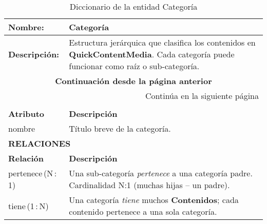 \renewcommand{\arraystretch}{1.3}
\begin{longtable}{|p{3.5cm}|p{10cm}|}
\caption{Diccionario de la entidad Categoría}
\label{tab:diccionarioCategoria} \\ 
\hline
\textbf{Nombre:} & Categoría \\
\hline
\textbf{Descripción:} & 
Estructura jerárquica que clasifica los contenidos en
\textbf{QuickContentMedia}.  Cada categoría puede funcionar como raíz o
sub-categoría. \\ \hline
\endfirsthead

\multicolumn{2}{c}{\textbf{Continuación desde la página anterior}} \\ 
\endhead

\hline \multicolumn{2}{r}{{Continúa en la siguiente página}} \\ 
\endfoot

\hline
\endlastfoot

\multicolumn{2}{|p{13.5cm}|}{\textbf{ATRIBUTOS}} \\ \hline
\textbf{Atributo} & \textbf{Descripción} \\ \hline
nombre             & Título breve de la categoría. \\ \hline

\multicolumn{2}{|p{13.5cm}|}{\textbf{RELACIONES}} \\ \hline
\textbf{Relación} & \textbf{Descripción} \\ \hline
pertenece\,(N\,:\,1) & Una sub-categoría \textit{pertenece} a
                       una categoría padre.  Cardinalidad N:1 (muchas hijas – un padre). \\ \hline
tiene\,(1\,:\,N) & Una categoría \textit{tiene} muchos
                   \textbf{Contenidos}; cada contenido pertenece a una sola categoría. \\ \hline
\end{longtable}